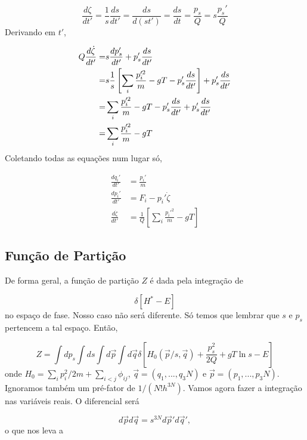 \documentclass[twoside, a4paper]{article}
\newcommand{\phiij}{\phi_{ij}}
\newcommand{\deri}[2]{\frac{d #1}{d #2}}
\begin{document}
\begin{equation}
	\deri{\zeta}{t'} = \frac{1}{s}\deri{s}{t'} = \deri{s}{(st')} = \deri{s}{t} = \frac{p_s}{Q} = s \frac{p_s'}{Q}
\end{equation}
Derivando em $t'$,

\begin{align}
	Q \deri{\dot{\zeta}}{t'} =& s \deri{p_s'}{t'} + p_s' \deri{s}{t'} \notag \\
		=& s \frac{1}{s} \left[ \sum_i \frac{p_i'^2}{m} -gT -p_s' \deri{s}{t'}\right] + p_s' \deri{s}{t'} \notag \\
		=& \sum_i \frac{p_i'^2}{m} -gT -p_s' \deri{s}{t'} + p_s' \deri{s}{t'} \notag \\
		=& \sum_i \frac{p_i'^2}{m} - gT 
\end{align}
Coletando todas as equações num lugar só,

\begin{align}
	\deri{q_i'}{t'} &= \frac{p_i'}{m} \\
	\deri{p_i'}{t'} &= F_i - p_i' \dot{\zeta} \\
	\deri{\dot{\zeta}}{t'} &=  \frac{1}{Q} \left[\sum_i \frac{p_i'^2}{m} - gT\right] 
\end{align}

\subsection{Função de Partição}

De forma geral, a função de partição $Z$ é dada pela integração de 

\begin{equation}
	\delta[H^* - E] 
\end{equation}
no espaço de fase. Nosso caso não será diferente. Só temos que lembrar que $s$ e $p_s$ pertencem a tal espaço. Então,

\begin{equation}
	Z = \int dp_s \int ds \int d\vec{p} \int d\vec{q} \delta\left[H_0(\vec{p}/s, \vec{q}) + \frac{p_s^2}{2Q} + gT \ln s -E \right]
\end{equation}
onde $H_0 = \sum_i p_i^2/2m + \sum_{i<j} \phiij$, $\vec{q} = (q_1,..., q_3N)$ e $\vec{p} = (p_1,..., p_3N)$. Ignoramos também um pré-fator de $1/(N!h^{3N})$. Vamos agora fazer a integração nas variáveis reais. O diferencial será

\begin{equation}
	d\vec{p} d\vec{q} =s^{3N} d\vec{p}' d\vec{q}',
\end{equation}
o que nos leva a 
\end{document}
